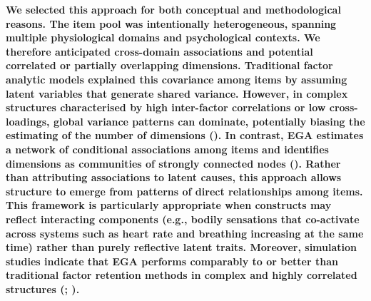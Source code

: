 \documentclass[
  man,
  floatsintext,
  longtable,
  nolmodern,
  notxfonts,
  notimes,
  mask,
  colorlinks=true,linkcolor=blue,citecolor=blue,urlcolor=blue]{apa7}
\begin{document}
\textbf{We selected this approach for both conceptual and methodological
reasons. The item pool was intentionally heterogeneous, spanning
multiple physiological domains and psychological contexts. We therefore
anticipated cross-domain associations and potential correlated or
partially overlapping dimensions. Traditional factor analytic models
explained this covariance among items by assuming latent variables that
generate shared variance. However, in complex structures characterised
by high inter-factor correlations or low cross-loadings, global variance
patterns can dominate, potentially biasing the estimating of the number
of dimensions (). In contrast, EGA estimates a network of conditional
associations among items and identifies dimensions as communities of
strongly connected nodes (). Rather than attributing associations to
latent causes, this approach allows structure to emerge from patterns of
direct relationships among items. This framework is particularly
appropriate when constructs may reflect interacting components (e.g.,
bodily sensations that co-activate across systems such as heart rate and
breathing increasing at the same time) rather than purely reflective
latent traits. Moreover, simulation studies indicate that EGA performs
comparably to or better than traditional factor retention methods in
complex and highly correlated structures
(; ).}
\end{document}

